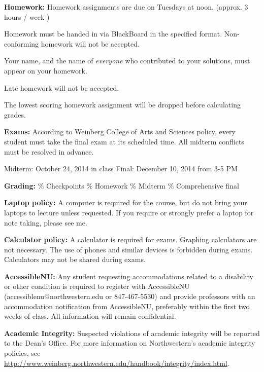 \documentclass[10pt]{article}
\begin{document}
\begin{outline}
   \2 {\bfseries Homework:} Homework assignments are due
   on Tuesdays at noon. (approx. 3 hours / week )

       \3 Homework must be handed in via BlackBoard in the specified format. Non-conforming homework will not be accepted. 

       \3 Your name, and the name of {\em everyone} who contributed to
       your solutions, must appear on your homework. 

       \3 Late homework will not be accepted.

       \3 The lowest scoring homework assignment will be dropped
       before calculating grades.
  
   \2 {\bfseries Exams:} According to Weinberg College of Arts and
   Sciences policy, every student must take the final exam at its
   scheduled time. All midterm conflicts must be resolved in advance.
       
       \3 Midterm: October 24, 2014 in class 
       \3 Final: December 10, 2014 from 3-5 PM

\1 {\bfseries Grading:}
  \% Checkpoints 
  \% Homework
  \% Midterm  
  \% Comprehensive final 

\1 {\bfseries Laptop policy:} A computer is required for the course,
but do not bring your laptops to lecture unless requested. If you
require or strongly prefer a laptop for note taking, please see me. 

\1 {\bfseries Calculator policy:} A calculator is required for
exams. Graphing calculators are not necessary. The use of phones and similar
devices is forbidden during exams. Calculators may not be shared
during exams.  

\1 {\bfseries AccessibleNU:} Any student requesting accommodations
related to a disability or other condition is required to register
with AccessibleNU (accessiblenu@northwestern.edu or 847-467-5530) and
provide professors with an accommodation notification from
AccessibleNU, preferably within the first two weeks of class. All
information will remain confidential.

\1 {\bfseries Academic Integrity:} Suspected violations of academic
integrity will be reported to the Dean's Office. For more information
on Northwestern’s academic integrity policies, see
\url{http://www.weinberg.northwestern.edu/handbook/integrity/index.html}.

\end{outline}

\break
\end{document}
